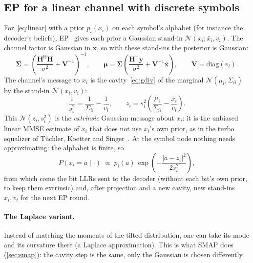 \documentclass[11pt,a4paper]{article}
\newcommand{\N}{\mathcal{N}}
\theoremstyle{definition}
\theoremstyle{remark}
\begin{document}
\subsection{EP for a linear channel with discrete symbols}

For~\eqref{eq:linear} with a prior $p_i(x_i)$ on each symbol's alphabet (for instance the decoder's beliefs), EP~\cite{cespedes} gives each prior a Gaussian stand-in $\N(x_i;\bar x_i,v_i)$. The channel factor is Gaussian in $\bm{x}$, so with these stand-ins the posterior is Gaussian:
\begin{equation}
  \bm{\Sigma} = \left(\frac{\bm{H}^{\mathsf H}\bm{H}}{\sigma^2} + \bm{V}^{-1}\right)^{-1},\qquad
  \bm{\mu} = \bm{\Sigma}\left(\frac{\bm{H}^{\mathsf H}\bm{y}}{\sigma^2} + \bm{V}^{-1}\bar{\bm{x}}\right),\qquad \bm{V}=\mathrm{diag}(v_i).
\end{equation}
The channel's message to $x_i$ is the cavity~\eqref{eq:gdiv} of the marginal $\N(\mu_i,\Sigma_{ii})$ by the stand-in $\N(\bar x_i,v_i)$:
\begin{equation}
  \frac{1}{s_i^2} = \frac{1}{\Sigma_{ii}}-\frac{1}{v_i},\qquad z_i = s_i^2\left(\frac{\mu_i}{\Sigma_{ii}}-\frac{\bar x_i}{v_i}\right).
  \label{eq:epcavity}
\end{equation}
This $\N(z_i,s_i^2)$ is the \emph{extrinsic} Gaussian message about $x_i$: it is the unbiased linear MMSE estimate of $x_i$ that does not use $x_i$'s own prior, as in the turbo equalizer of T\"uchler, Koetter and Singer~\cite{tuchlertsp,tuchlertcom}. At the symbol node nothing needs approximating: the alphabet is finite, so
\begin{equation}
  P(x_i = a\mid\cdot) \;\propto\; p_i(a)\,\exp\!\left(-\frac{|a-z_i|^2}{2s_i^2}\right),
  \label{eq:symnode}
\end{equation}
from which come the bit LLRs sent to the decoder (without each bit's own prior, to keep them extrinsic) and, after projection and a new cavity, new stand-ins $\bar x_i, v_i$ for the next EP round.

\paragraph{The Laplace variant.} Instead of matching the moments of the tilted distribution, one can take its mode and its curvature there (a Laplace approximation). This is what SMAP does (\cref{sec:smap}): the cavity step is the same, only the Gaussian is chosen differently.

\end{document}
